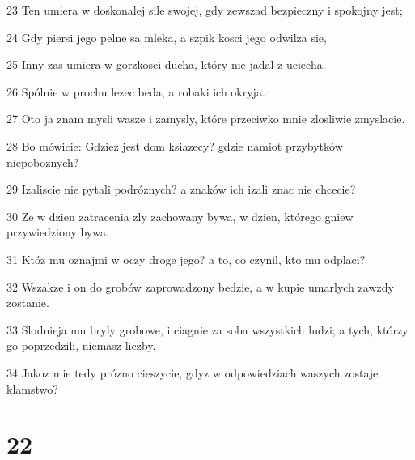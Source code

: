 \par 23 Ten umiera w doskonalej sile swojej, gdy zewszad bezpieczny i spokojny jest;
\par 24 Gdy piersi jego pelne sa mleka, a szpik kosci jego odwilza sie,
\par 25 Inny zas umiera w gorzkosci ducha, który nie jadal z uciecha.
\par 26 Spólnie w prochu lezec beda, a robaki ich okryja.
\par 27 Oto ja znam mysli wasze i zamysly, które przeciwko mnie zlosliwie zmyslacie.
\par 28 Bo mówicie: Gdziez jest dom ksiazecy? gdzie namiot przybytków niepoboznych?
\par 29 Izaliscie nie pytali podróznych? a znaków ich izali znac nie chcecie?
\par 30 Ze w dzien zatracenia zly zachowany bywa, w dzien, którego gniew przywiedziony bywa.
\par 31 Któz mu oznajmi w oczy droge jego? a to, co czynil, kto mu odplaci?
\par 32 Wszakze i on do grobów zaprowadzony bedzie, a w kupie umarlych zawzdy zostanie.
\par 33 Slodnieja mu bryly grobowe, i ciagnie za soba wszystkich ludzi; a tych, którzy go poprzedzili, niemasz liczby.
\par 34 Jakoz mie tedy prózno cieszycie, gdyz w odpowiedziach waszych zostaje klamstwo?

\chapter{22}

